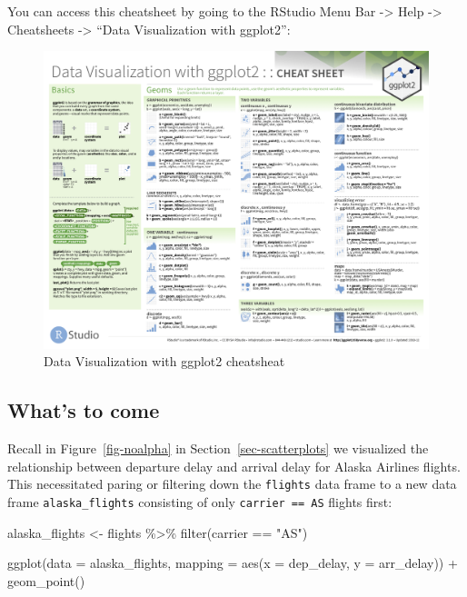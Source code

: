 \documentclass[
  letterpaper,
  DIV=11,
  numbers=noendperiod]{scrreprt}
\newenvironment{Shaded}{\begin{snugshade}}{\end{snugshade}}
\newcommand{\AttributeTok}[1]{\textcolor[rgb]{0.40,0.45,0.13}{#1}}
\newcommand{\FunctionTok}[1]{\textcolor[rgb]{0.28,0.35,0.67}{#1}}
\newcommand{\NormalTok}[1]{\textcolor[rgb]{0.00,0.23,0.31}{#1}}
\newcommand{\OtherTok}[1]{\textcolor[rgb]{0.00,0.23,0.31}{#1}}
\newcommand{\SpecialCharTok}[1]{\textcolor[rgb]{0.37,0.37,0.37}{#1}}
\newcommand{\StringTok}[1]{\textcolor[rgb]{0.13,0.47,0.30}{#1}}
\theoremstyle{definition}
\theoremstyle{remark}
\begin{document}
You can access this cheatsheet by going to the RStudio Menu Bar
-\textgreater{} Help -\textgreater{} Cheatsheets -\textgreater{} ``Data
Visualization with ggplot2'':

\begin{figure}

{\centering \includegraphics{images/ggplot_cheatsheet-1.png}

}

\caption{\label{fig-ggplot-cheatsheet}Data Visualization with ggplot2
cheatsheat}

\end{figure}

\hypertarget{sec-whats-to-come-3}{%
\subsection{What's to come}\label{sec-whats-to-come-3}}

Recall in Figure~\ref{fig-noalpha} in Section~\ref{sec-scatterplots} we
visualized the relationship between departure delay and arrival delay
for Alaska Airlines flights. This necessitated paring or filtering down
the \texttt{flights} data frame to a new data frame
\texttt{alaska\_flights} consisting of only \texttt{carrier\ ==\ AS}
flights first:

\begin{Shaded}
\begin{Highlighting}[]
\NormalTok{alaska\_flights }\OtherTok{\textless{}{-}}\NormalTok{ flights }\SpecialCharTok{\%\textgreater{}\%} 
  \FunctionTok{filter}\NormalTok{(carrier }\SpecialCharTok{==} \StringTok{"AS"}\NormalTok{)}

\FunctionTok{ggplot}\NormalTok{(}\AttributeTok{data =}\NormalTok{ alaska\_flights, }\AttributeTok{mapping =} \FunctionTok{aes}\NormalTok{(}\AttributeTok{x =}\NormalTok{ dep\_delay, }\AttributeTok{y =}\NormalTok{ arr\_delay)) }\SpecialCharTok{+} 
  \FunctionTok{geom\_point}\NormalTok{()}
\end{Highlighting}
\end{Shaded}
\end{document}

